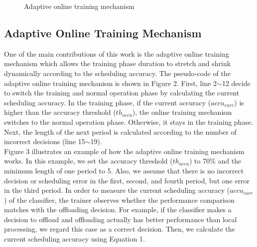 \documentclass[10pt, conference, compsocconf]{IEEEtran}
\begin{document}
{\begin{figure}
\begin{algorithmic}[1]
	\ELSE
		\ELSE
		\ENDIF
	\ENDIF
\ENDWHILE
\STATE
{}
\ELSE
\ENDIF
\end{algorithmic}
\caption{Adaptive online training mechanism}
\end{figure}
%
\subsection{Adaptive Online Training Mechanism}
%
One of the main contributions of this work is the adaptive online
training mechanism which allows the training phase duration to stretch
and shrink dynamically according to the scheduling accuracy.
%
The pseudo-code of the adaptive online training mechanism is shown in
Figure 2.
%
First, line 2$\sim$12 decide to switch the training and normal operation
phase by calculating the current scheduling accuracy.
%
In the training phase, if the current accuracy ($accu_{curr}$) is higher
than the accuracy threshold ($th_{accu}$), the online training mechanism
switches to the normal operation phase.
%
Otherwise, it stays in the training phase.
%
Next, the length of the next period is calculated according to the
number of incorrect decisions (line 15$\sim$19).\\
%
\indent Figure 3 illustrates an example of how the adaptive online
training mechanism works.
%
In this example, we set the accuracy threshold ($th_{accu}$) to 70\% and
the minimum length of one period to 5.
%
Also, we assume that there is no incorrect decision or scheduling error
in the first, second, and fourth period, but one error in the third
period.
%
In order to measure the current scheduling accuracy ($accu_{curr}$) of
the classifier, the trainer observes whether the performance comparison
matches with the offloading decision.
%
For example, if the classifier makes a decision to offload and
offloading actually has better performance than local processing, we
regard this case as a correct decision.
%
Then, we calculate the current scheduling accuracy using Equation 1.
}
\end{document}
